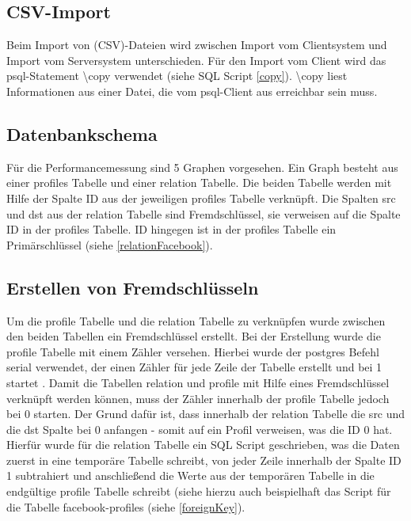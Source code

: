 \subsection{CSV-Import}
Beim Import von (CSV)-Dateien wird zwischen Import vom Clientsystem und  Import vom Serversystem unterschieden.
Für den Import vom Client wird das psql-Statement \textbackslash copy verwendet (siehe SQL Script \ref{copy}). \textbackslash copy liest Informationen aus einer Datei,
die vom psql-Client aus erreichbar sein muss. \cite{postgres2018}

\subsection{Datenbankschema}
Für die Performancemessung sind 5 Graphen vorgesehen. Ein Graph besteht aus einer profiles Tabelle und einer relation Tabelle. Die beiden Tabelle werden mit Hilfe der
Spalte ID aus der jeweiligen profiles Tabelle verknüpft. Die Spalten src und dst aus der relation Tabelle sind Fremdschlüssel, sie verweisen auf die Spalte ID in der
profiles Tabelle. ID hingegen ist in der profiles Tabelle ein Primärschlüssel (siehe \ref{relationFacebook}).

\subsection{Erstellen von Fremdschlüsseln}
Um die profile Tabelle und die relation Tabelle zu verknüpfen wurde zwischen den beiden Tabellen ein Fremdschlüssel erstellt. Bei der Erstellung wurde die profile Tabelle
mit einem Zähler versehen. Hierbei wurde der postgres Befehl serial verwendet, der einen Zähler für jede Zeile der Tabelle erstellt und bei 1 startet . Damit die Tabellen
relation und profile mit Hilfe eines Fremdschlüssel verknüpft werden können, muss der Zähler innerhalb der profile Tabelle jedoch bei 0 starten. Der Grund dafür ist, dass
innerhalb der relation Tabelle die src und die dst Spalte bei 0 anfangen - somit auf ein Profil verweisen, was die ID 0 hat. Hierfür wurde für die relation Tabelle ein
SQL Script geschrieben, was die Daten zuerst in eine temporäre Tabelle schreibt, von jeder Zeile innerhalb der Spalte ID 1 subtrahiert und anschließend die Werte aus
der temporären Tabelle in die endgültige profile Tabelle schreibt (siehe hierzu auch beispielhaft das Script für die Tabelle facebook-profiles (siehe \ref{foreignKey}).


